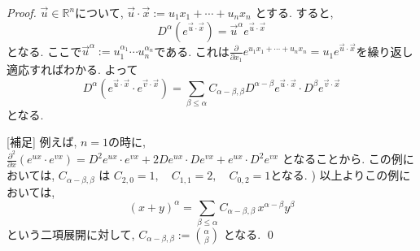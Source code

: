 \begin{proof}
 \(\overrightarrow{u} \in \mathbb{R}^n\)について, 
 \(\overrightarrow{u} \cdot \overrightarrow{x} := u_1 x_1 + \cdots + u_n x_n\) とする.
 すると, 
\[
D^\alpha \left( e^{\overrightarrow{u} \cdot \overrightarrow{x}} \right) = \overrightarrow{u}^\alpha e^{\overrightarrow{u} \cdot \overrightarrow{x}}
\]
となる. ここで$\overrightarrow{u}^{\alpha}:=u_{1}^{\alpha_1} \cdots u_{n}^{\alpha_n}$である. 
これは\( \frac{\partial}{\partial x_1} e^{u_1 x_1 + \cdots + u_n x_n} = u_1 e^{\overrightarrow{u} \cdot \overrightarrow{x}}\)を繰り返し適応すればわかる. 
よって
\[
D^\alpha(e^{\overrightarrow{u} \cdot \overrightarrow{x}} \cdot e^{\overrightarrow{v} \cdot \overrightarrow{x}}) = 
\sum_{\beta \le \alpha} C_{\alpha-\beta,\beta} D^{\alpha-\beta} e^{\overrightarrow{u} \cdot \overrightarrow{x}} \cdot D^\beta e^{\overrightarrow{v} \cdot \overrightarrow{x}}
\]
となる. 

[補足] 例えば, $n=1$の時に, \(\frac{\partial^2}{\partial x} \left( e^{u x} \cdot e^{v x} \right)
= D^2 e^{u x} \cdot e^{v x} + 2 D e^{u x} \cdot D e^{v x} + e^{ux} \cdot D^2 e^{v x}
\)
となることから. この例においては, \(C_{\alpha-\beta,\beta}\) は
\(C_{2,0} = 1, \quad C_{1,1} = 2, \quad C_{0,2} = 1\)となる. )
以上よりこの例においては, 
\[
(x+y)^\alpha = \sum_{\beta \le \alpha} C_{\alpha-\beta,\beta} \, x^{\alpha-\beta} y^\beta
\]
という二項展開に対して,  \(C_{\alpha-\beta,\beta} := \binom{\alpha}{\beta}\) となる. \qed


\end{proof}
